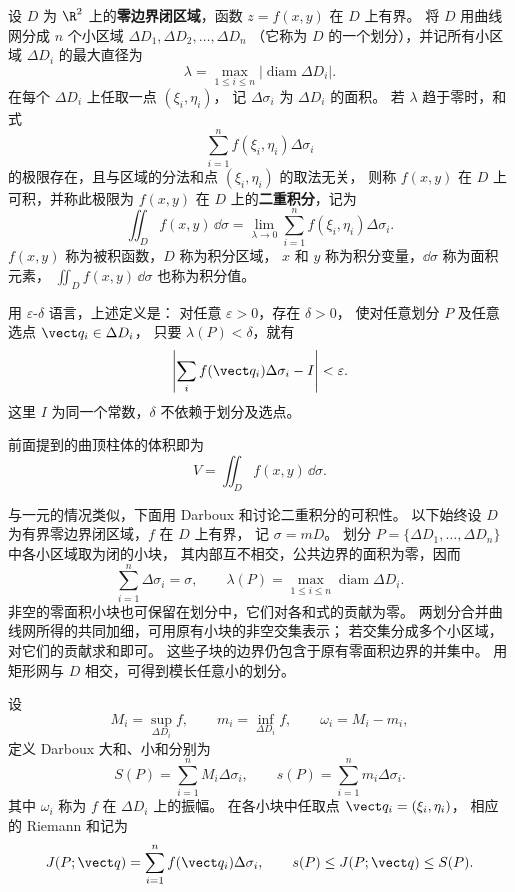 \begin{definition}[二重积分]
设 $D$ 为 $\R^2$ 上的\textbf{零边界闭区域}，函数 $z=f(x,y)$ 在 $D$ 上有界。
将 $D$ 用曲线网分成 $n$ 个小区域
$\Delta D_1,\Delta D_2,\ldots,\Delta D_n$
（它称为 $D$ 的一个划分），并记所有小区域
$\Delta D_i$ 的最大直径为
\[
\lambda=\max_{1\le i\le n}|\operatorname{diam}\Delta D_i|.
\]
在每个 $\Delta D_i$ 上任取一点 $(\xi_i,\eta_i)$，
记 $\Delta\sigma_i$ 为 $\Delta D_i$ 的面积。
若 $\lambda$ 趋于零时，和式
\[
\sum_{i=1}^n f(\xi_i,\eta_i)\Delta\sigma_i
\]
的极限存在，且与区域的分法和点
$(\xi_i,\eta_i)$ 的取法无关，
则称 $f(x,y)$ 在 $D$ 上可积，并称此极限为
$f(x,y)$ 在 $D$ 上的\textbf{二重积分}，记为
\[
\iint_D f(x,y)\,\dd\sigma
=\lim_{\lambda\to0}
\sum_{i=1}^n f(\xi_i,\eta_i)\Delta\sigma_i.
\]
$f(x,y)$ 称为被积函数，$D$ 称为积分区域，
$x$ 和 $y$ 称为积分变量，$\dd\sigma$ 称为面积元素，
$\displaystyle\iint_D f(x,y)\,\dd\sigma$ 也称为积分值。
\end{definition}

用 $\varepsilon$-$\delta$ 语言，上述定义是：
对任意 $\varepsilon>0$，存在 $\delta>0$，
使对任意划分 $P$ 及任意选点 $ \vect q_i\in\Delta D_i$，
只要 $\lambda(P)<\delta$，就有
\[
\left|\sum_i f(\vect q_i)\Delta\sigma_i-I\right|<\varepsilon.
\]
这里 $I$ 为同一个常数，$\delta$ 不依赖于划分及选点。

前面提到的曲顶柱体的体积即为
\[
V=\iint_D f(x,y)\,\dd\sigma.
\]

与一元的情况类似，下面用 Darboux 和讨论二重积分的可积性。
以下始终设 $D$ 为有界零边界闭区域，$f$ 在 $D$ 上有界，
记 $\sigma=mD$。
划分 $P=\{\Delta D_1,\ldots,\Delta D_n\}$ 中各小区域取为闭的小块，
其内部互不相交，公共边界的面积为零，因而
\[
\sum_{i=1}^n\Delta\sigma_i=\sigma,
\qquad
\lambda(P)=\max_{1\le i\le n}\operatorname{diam}\Delta D_i.
\]
非空的零面积小块也可保留在划分中，它们对各和式的贡献为零。
两划分合并曲线网所得的共同加细，可用原有小块的非空交集表示；
若交集分成多个小区域，对它们的贡献求和即可。
这些子块的边界仍包含于原有零面积边界的并集中。
用矩形网与 $D$ 相交，可得到模长任意小的划分。

设
\[
M_i=\sup_{\Delta D_i}f,\qquad
m_i=\inf_{\Delta D_i}f,\qquad
\omega_i=M_i-m_i,
\]
定义 Darboux 大和、小和分别为
\[
S(P)=\sum_{i=1}^n M_i\Delta\sigma_i,\qquad
s(P)=\sum_{i=1}^n m_i\Delta\sigma_i.
\]
其中 $\omega_i$ 称为 $f$ 在 $\Delta D_i$ 上的振幅。
在各小块中任取点 $\vect q_i=(\xi_i,\eta_i)$，
相应的 Riemann 和记为
\[
J(P;\vect q)=\sum_{i=1}^n f(\vect q_i)\Delta\sigma_i,
\qquad
s(P)\le J(P;\vect q)\le S(P).
\]

